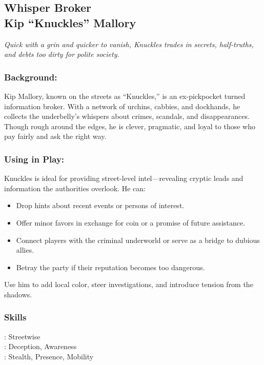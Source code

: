     \clearpage
    \subsection{{\small Whisper Broker}\\ Kip “Knuckles” Mallory}
    \label{npc:kip-mallory}
    
    \emph{Quick with a grin and quicker to vanish, Knuckles trades in secrets, half-truths, and debts too dirty for polite society.}
    \vspace{.5\baselineskip}
    
    \begin{paracol}{3}
        \subsubsection*{Background:}
        Kip Mallory, known on the streets as “Knuckles,” is an ex-pickpocket turned information broker. With a network of urchins, cabbies, and dockhands, he collects the underbelly’s whispers about crimes, scandals, and disappearances. Though rough around the edges, he is clever, pragmatic, and loyal to those who pay fairly and ask the right way.
        
        \switchcolumn
        \subsubsection*{Using in Play:}
        Knuckles is ideal for providing street-level intel—revealing cryptic leads and information the authorities overlook. He can:
        \begin{itemize}
          \item Drop hints about recent events or persons of interest.
          \item Offer minor favors in exchange for coin or a promise of future assistance.
          \item Connect players with the criminal underworld or serve as a bridge to dubious allies.
          \item Betray the party if their reputation becomes too dangerous.
        \end{itemize}
        Use him to add local color, steer investigations, and introduce tension from the shadows.
        
        \switchcolumn      
        \subsubsection{Skills}
            \noindent\Expert: Streetwise \\
            \noindent\Skilled: Deception, Awareness \\
            \noindent\Novice: Stealth, Presence, Mobility \\

\end{paracol}
